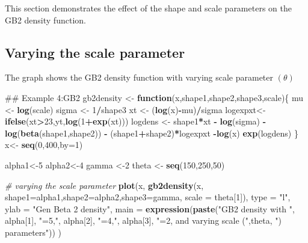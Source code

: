 \documentclass[]{book}
\newenvironment{Shaded}{\begin{snugshade}}{\end{snugshade}}
\newcommand{\KeywordTok}[1]{\textcolor[rgb]{0.13,0.29,0.53}{\textbf{#1}}}
\newcommand{\DataTypeTok}[1]{\textcolor[rgb]{0.13,0.29,0.53}{#1}}
\newcommand{\DecValTok}[1]{\textcolor[rgb]{0.00,0.00,0.81}{#1}}
\newcommand{\StringTok}[1]{\textcolor[rgb]{0.31,0.60,0.02}{#1}}
\newcommand{\CommentTok}[1]{\textcolor[rgb]{0.56,0.35,0.01}{\textit{#1}}}
\newcommand{\ControlFlowTok}[1]{\textcolor[rgb]{0.13,0.29,0.53}{\textbf{#1}}}
\newcommand{\OperatorTok}[1]{\textcolor[rgb]{0.81,0.36,0.00}{\textbf{#1}}}
\newcommand{\NormalTok}[1]{#1}
\theoremstyle{definition}
\theoremstyle{definition}
\theoremstyle{definition}
\theoremstyle{remark}
\begin{document}
This section demonstrates the effect of the shape and scale parameters
on the GB2 density function.

\subsection{Varying the scale
parameter}\label{varying-the-scale-parameter-3}

The graph shows the GB2 density function with varying scale parameter
\((\theta)\)

\begin{Shaded}
\begin{Highlighting}[]
\NormalTok{## Example 4:GB2}
\NormalTok{gb2density <-}\StringTok{ }\ControlFlowTok{function}\NormalTok{(x,shape1,shape2,shape3,scale)\{}
\NormalTok{  mu <-}\StringTok{ }\KeywordTok{log}\NormalTok{(scale)}
\NormalTok{  sigma <-}\StringTok{ }\DecValTok{1}\OperatorTok{/}\NormalTok{shape3}
\NormalTok{  xt <-}\StringTok{ }\NormalTok{(}\KeywordTok{log}\NormalTok{(x)}\OperatorTok{-}\NormalTok{mu)}\OperatorTok{/}\NormalTok{sigma}
\NormalTok{  logexpxt<-}\KeywordTok{ifelse}\NormalTok{(xt}\OperatorTok{>}\DecValTok{23}\NormalTok{,yt,}\KeywordTok{log}\NormalTok{(}\DecValTok{1}\OperatorTok{+}\KeywordTok{exp}\NormalTok{(xt)))}
\NormalTok{  logdens <-}\StringTok{ }\NormalTok{shape1}\OperatorTok{*}\NormalTok{xt }\OperatorTok{-}\StringTok{ }\KeywordTok{log}\NormalTok{(sigma) }\OperatorTok{-}\StringTok{ }\KeywordTok{log}\NormalTok{(}\KeywordTok{beta}\NormalTok{(shape1,shape2)) }\OperatorTok{-}\StringTok{ }\NormalTok{(shape1}\OperatorTok{+}\NormalTok{shape2)}\OperatorTok{*}\NormalTok{logexpxt }\OperatorTok{-}\KeywordTok{log}\NormalTok{(x) }
  \KeywordTok{exp}\NormalTok{(logdens)}
\NormalTok{\}}
\NormalTok{x<-}\StringTok{ }\KeywordTok{seq}\NormalTok{(}\DecValTok{0}\NormalTok{,}\DecValTok{400}\NormalTok{,}\DataTypeTok{by=}\DecValTok{1}\NormalTok{)}

\NormalTok{alpha1<-}\DecValTok{5}
\NormalTok{alpha2<-}\DecValTok{4} 
\NormalTok{gamma <-}\DecValTok{2}
\NormalTok{theta <-}\StringTok{ }\KeywordTok{seq}\NormalTok{(}\DecValTok{150}\NormalTok{,}\DecValTok{250}\NormalTok{,}\DecValTok{50}\NormalTok{)}

\CommentTok{# varying the scale parameter}
\KeywordTok{plot}\NormalTok{(x, }\KeywordTok{gb2density}\NormalTok{(x, }\DataTypeTok{shape1=}\NormalTok{alpha1,}\DataTypeTok{shape2=}\NormalTok{alpha2,}\DataTypeTok{shape3=}\NormalTok{gamma, }\DataTypeTok{scale =}\NormalTok{ theta[}\DecValTok{1}\NormalTok{]), }
     \DataTypeTok{type =} \StringTok{"l"}\NormalTok{, }\DataTypeTok{ylab =} \StringTok{"Gen Beta 2 density"}\NormalTok{,}
     \DataTypeTok{main =} 
     \KeywordTok{expression}\NormalTok{(}\KeywordTok{paste}\NormalTok{(}\StringTok{"GB2 density with "}\NormalTok{, alpha[}\DecValTok{1}\NormalTok{], }\StringTok{"=5,"}\NormalTok{, alpha[}\DecValTok{2}\NormalTok{], }\StringTok{"=4,"}\NormalTok{, alpha[}\DecValTok{3}\NormalTok{], }
                      \StringTok{"=2, and varying scale ("}\NormalTok{,theta, }\StringTok{") parameters"}\NormalTok{)) )}


\end{Highlighting}
\end{Shaded}
\end{document}
